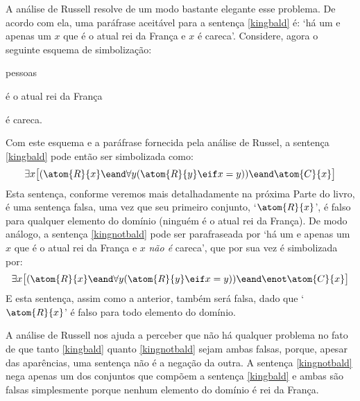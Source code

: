 A análise de Russell resolve de um modo bastante elegante esse problema.
De acordo com ela, uma paráfrase aceitável para a sentença \ref{kingbald} é: `há um e apenas um $x$ que é o atual rei da França e $x$ é careca'.
Considere, agora o seguinte esquema de simbolização:
	\begin{center}
	\begin{ekey}
		\item[\text{domínio}] pessoas
		\item[\atom{R}{x}]  é o atual rei da França
		\item[\atom{C}{x}]  é careca.
	\end{ekey}
	\end{center}
Com este esquema e a paráfrase fornecida pela análise de Russel, a sentença \ref{kingbald} pode então ser simbolizada como:
$$\exists x \bigl[(\atom{R}{x} \eand \forall y (\atom{R}{y} \eif x = y)) \eand \atom{C}{x}\bigr]$$
Esta sentença, conforme veremos mais detalhadamente na próxima Parte do livro, é uma sentença falsa, uma vez que seu primeiro conjunto, `$\atom{R}{x}$', é falso para qualquer elemento do domínio (ninguém é o atual rei da França).
De modo análogo, a sentença \ref{kingnotbald} pode ser parafraseada por `há um e apenas um $x$ que é o atual rei da França e $x$ \emph{não é} careca', que por sua vez é simbolizada por:
$$\exists x \bigl[(\atom{R}{x} \eand \forall y (\atom{R}{y} \eif x = y)) \eand \enot\atom{C}{x}\bigr]$$
E esta sentença, assim como a anterior, também será falsa, dado que `$\atom{R}{x}$' é falso para todo elemento do domínio.

A análise de Russell nos ajuda a perceber que não há qualquer problema no fato de que tanto \ref{kingbald} quanto \ref{kingnotbald} sejam ambas falsas, porque, apesar das aparências, uma sentença não é a negação da outra.
A sentença  \ref{kingnotbald} nega apenas um dos conjuntos que compõem a sentença \ref{kingbald} e ambas são falsas simplesmente porque nenhum elemento do domínio é rei da França.

